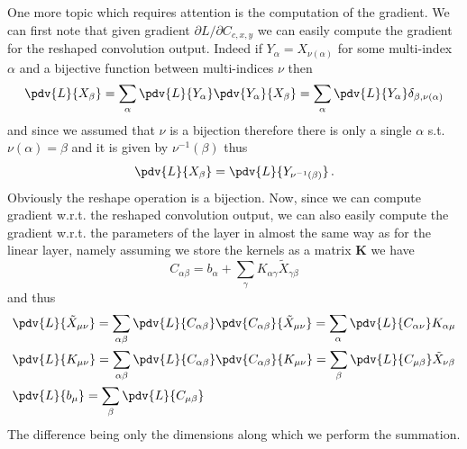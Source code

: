 \documentclass[a5paper]{article}
\begin{document}
One more topic which requires attention is the computation of the gradient. We can first note that
given gradient $\partial{L}/\partial{C_{c,x,y}}$ we can easily compute the gradient for the reshaped
convolution output. Indeed if $Y_\alpha = X_{\nu(\alpha)}$ for some multi-index $\alpha$ and a
bijective function between multi-indices $\nu$ then
\[
   \pdv{L}{X_\beta} = \sum_{\alpha} \pdv{L}{Y_\alpha} \pdv{Y_\alpha}{X_\beta} = \sum_{\alpha} \pdv{L}{Y_\alpha} \delta_{\beta, \nu(\alpha)}
\]
and since we assumed that $\nu$ is a bijection therefore there is only a single $\alpha$ s.t.
$\nu(\alpha) = \beta$ and it is given by $\nu^{-1}(\beta)$ thus
\[
   \pdv{L}{X_\beta} = \pdv{L}{Y_{\nu^{-1}(\beta)}}\,.
\]
Obviously the reshape operation is a bijection. Now, since we can compute gradient w.r.t. the
reshaped convolution output, we can also easily compute the gradient w.r.t. the parameters of the
layer in almost the same way as for the linear layer, namely assuming we store the kernels as a
matrix $\bm{K}$ we have
\[
   C_{\alpha\beta} = b_\alpha + \sum_{\gamma} K_{\alpha\gamma} \tilde{X}_{\gamma\beta}
\]
and thus
\[
\begin{split}
   &\pdv{L}{\tilde{X}_{\mu\nu}} = \sum_{\alpha\beta} \pdv{L}{C_{\alpha\beta}} \pdv{C_{\alpha\beta}}{\tilde{X}_{\mu\nu}} 
                                = \sum_{\alpha} \pdv{L}{C_{\alpha\nu}} K_{\alpha\mu}\\
   &\pdv{L}{K_{\mu\nu}} = \sum_{\alpha\beta} \pdv{L}{C_{\alpha\beta}} \pdv{C_{\alpha\beta}}{K_{\mu\nu}} 
                        = \sum_{\beta} \pdv{L}{C_{\mu\beta}} \tilde{X}_{\nu\beta}\\
   &\pdv{L}{b_\mu} = \sum_{\beta} \pdv{L}{C_{\mu\beta}}
\end{split}
\]
The difference being only the dimensions along which we perform the summation.
\end{document}
